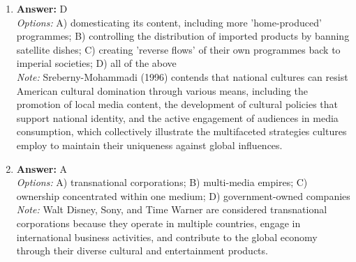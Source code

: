 \documentclass[12pt]{article}
\begin{document}
\begin{enumerate}[label=\arabic*.]
\item \textbf{Answer:} D
\\ \textit{Options:} A) domesticating its content, including more 'home-produced' programmes; B) controlling the distribution of imported products by banning satellite dishes; C) creating 'reverse flows' of their own programmes back to imperial societies; D) all of the above
\\ \textit{Note:} Sreberny-Mohammadi (1996) contends that national cultures can resist American cultural domination through various means, including the promotion of local media content, the development of cultural policies that support national identity, and the active engagement of audiences in media consumption, which collectively illustrate the multifaceted strategies cultures employ to maintain their uniqueness against global influences.
\item \textbf{Answer:} A
\\ \textit{Options:} A) transnational corporations; B) multi-media empires; C) ownership concentrated within one medium; D) government-owned companies
\\ \textit{Note:} Walt Disney, Sony, and Time Warner are considered transnational corporations because they operate in multiple countries, engage in international business activities, and contribute to the global economy through their diverse cultural and entertainment products.
\end{enumerate}
\end{document}
